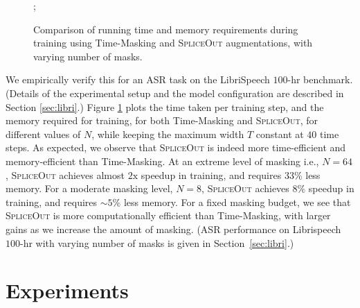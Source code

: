 \documentclass{article}
\newcommand{\SpA}{{\textsc{SpliceOut}}\xspace}
\begin{document}
\begin{figure}
{};
\caption{Comparison of running time and memory requirements during training using Time-Masking and \SpA augmentations, with varying number of masks.}
\label{fig:efficiency}
\end{figure}

We empirically verify this for an ASR task on the LibriSpeech $100$-hr benchmark. (Details of the experimental setup and the model configuration are described in Section \ref{sec:libri}.) 
Figure \ref{fig:efficiency} plots the time taken per training step, and the memory required for training, for both Time-Masking and \SpA, for different values of $N$, while keeping the maximum width $T$ constant at $40$ time steps. As expected, we observe that \SpA is indeed more time-efficient and memory-efficient than Time-Masking. At an extreme level of masking i.e., $N=64$, \SpA achieves almost $2\text{x}$ speedup in training, and requires $33\%$ less memory. For a moderate masking level, $N=8$, \SpA achieves $8\%$ speedup in training, and requires $\sim 5\%$ less memory. For a fixed masking budget, we see that \SpA is more computationally efficient than Time-Masking, with larger gains as we increase the amount of masking. (ASR performance on Librispeech $100$-hr with varying number of masks is given in Section~\ref{sec:libri}.) 

\section{Experiments}
\label{sec:expts}
\end{document}
